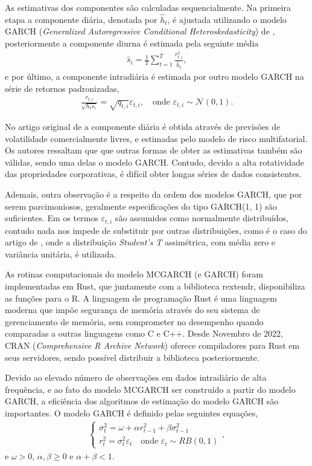 \documentclass{article}
\begin{document}
As estimativas dos componentes são calculadas sequencialmente. Na primeira etapa a componente diária, denotada por $\hat{h}_{t}$, é ajustada utilizando o modelo GARCH (\textit{Generalized Autoregressive Conditional Heteroskedasticity}) de \citet{Bollerslev_1986}, posteriormente a componente diurna é estimada pela seguinte média
\begin{align*}
    \hat{s}_{i} = \frac{1}{T} \sum_{t = 1}^{T} \frac{r_{t,i}^{2}}{\hat{h}_{t}},
\end{align*}
e por último, a componente intradiária é estimada por outro modelo GARCH na série de retornos padronizadas,
\begin{align*}
    \frac{r_{t,i}}{\sqrt{h_{t} s_{i}}} = \sqrt{q_{t,i}} \varepsilon_{t,i}, \quad \text{onde $\varepsilon_{t,i} \sim \mathcal{N}(0,1)$}.
\end{align*}

No artigo original de \citet{Engle_Sokalska_2012} a componente diária é obtida através de previsões de volatilidade comercialmente livres, e estimadas pelo modelo de risco multifatorial. Os autores ressaltam que que outras formas de obter as estimativas também são válidas, sendo uma delas o modelo GARCH. Contudo, devido a alta rotatividade das propriedades corporativas, é difícil obter longas séries de dados consistentes.

Ademais, outra observação é a respeito da ordem dos modelos GARCH, que por serem parcimoniosos, geralmente especificações do tipo GARCH(1, 1) são suficientes. Em \citet{Engle_Sokalska_2012} os termos $\varepsilon_{t,i}$ são assumidos como normalmente distribuídos, contudo nada nos impede de substituir por outras distribuições, como é o caso do artigo de \citet{Ke_etal_2026}, onde a distribuição \textit{Student's T} assimétrica, com média zero e variância unitária, é utilizada.

As rotinas computacionais do modelo MCGARCH (e GARCH) foram implementadas em Rust, que juntamente com a biblioteca rextendr, disponibiliza as funções para o R. A linguagem de programação Rust é uma linguagem moderna que impõe segurança de memória através do seu sistema de gerenciamento de memória, sem comprometer no desempenho quando comparadas a outras linguagens como C e C++. Desde Novembro de 2022, CRAN (\textit{Comprehensive R Archive Network}) oferece compiladores para Rust em seus servidores, sendo possível distribuir a biblioteca posteriormente.

Devido ao elevado número de observações em dados intradiário de alta frequência, e ao fato do modelo MCGARCH ser construído a partir do modelo GARCH, a eficiência dos algoritmos de estimação do modelo GARCH são importantes. O modelo GARCH é definido pelas seguintes equações,
\begin{align*}
    \begin{cases}
        \sigma_{t}^{2} = \omega + \alpha r_{t-1}^{2} + \beta \sigma_{t-1}^{2} \\
        r_{t}^{2} = \sigma_{t}^{2} \varepsilon_{t} \quad \text{onde $\varepsilon_{t} \sim RB(0, 1)$}
    \end{cases},
\end{align*}
e $\omega > 0$, $\alpha, \beta \geq 0$ e $\alpha + \beta < 1$.
\end{document}
